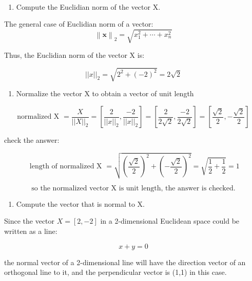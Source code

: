 \documentclass[11pt]{article}
\providecommand{\tightlist}{%
      \setlength{\itemsep}{0pt}\setlength{\parskip}{0pt}}
\begin{document}
    \begin{center}
    \end{center}
    { \hspace*{\fill} \\}
    
    \begin{enumerate}
\def\labelenumi{(\alph{enumi})}
\setcounter{enumi}{1}
\tightlist
\item
  Compute the Euclidian norm of the vector X.
\end{enumerate}

The general case of Euclidian norm of a vector:
\[{\displaystyle \left\|{\boldsymbol {x}}\right\|_{2}={\sqrt {x_{1}^{2}+\cdots +x_{n}^{2}}}}\]

Thus, the Euclidian norm of the vector X is:

\[||x||_2 = \sqrt{2^2 + (-2)^2} = 2 \sqrt{2}\]

    \begin{enumerate}
\def\labelenumi{(\alph{enumi})}
\setcounter{enumi}{2}
\tightlist
\item
  Normalize the vector X to obtain a vector of unit length
\end{enumerate}

\[\text{normalized X } = \frac{X}{||X||_2}  = [\frac{2}{||x||_2}, \frac{-2}{||x||_2}] = [\frac{2}{2\sqrt{2}}, \frac{-2}{2\sqrt{2}}] = [\frac{\sqrt{2}}{2}, -\frac{\sqrt{2}}{2}]\]

check the answer:

\[\text{ length of normalized X } = \sqrt{\left (\frac{\sqrt{2}}{2} \right )^2 + \left (-\frac{\sqrt{2}}{2} \right )^2} = \sqrt{\frac{1}{2} + \frac{1}{2}} = 1 \]

\[\text {so the normalized vector X is unit length, the answer is checked.} \]

    \begin{enumerate}
\def\labelenumi{(\alph{enumi})}
\setcounter{enumi}{3}
\tightlist
\item
  Compute the vector that is normal to X.
\end{enumerate}

Since the vector \(X = [2, -2]\) in a 2-dimensional Euclidean space
could be written as a line:

\[x+y = 0\]

the normal vector of a 2-dimensional line will have the direction vector
of an orthogonal line to it, and the perpendicular vector is (1,1) in
this case.
\end{document}
